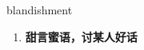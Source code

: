 
\begin{frame}
{\huge blandishment}
\begin{center}
\begin{enumerate}\Large
  \item \textbf{甜言蜜语，讨某人好话}
\end{enumerate}
\end{center}
\end{frame}
